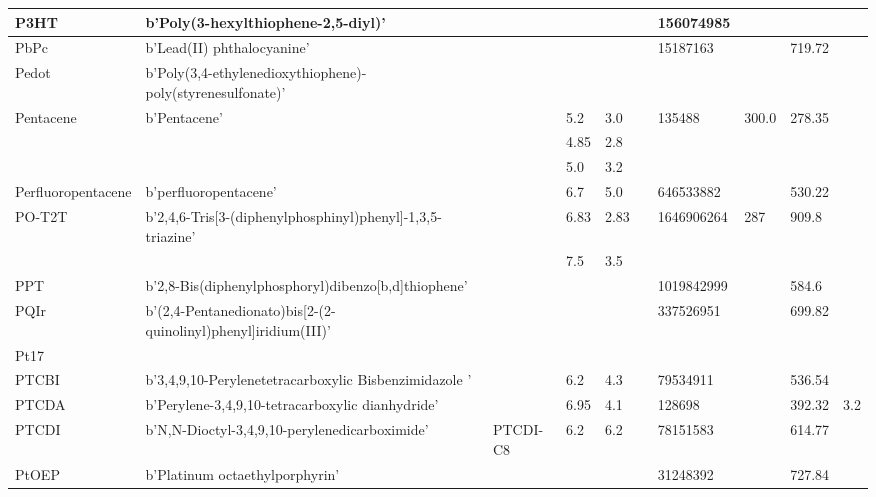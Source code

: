 \documentclass[../thesis.tex]{subfiles}
\begin{document}
\begin{landscape}
\begin{longtable}{| p{} | p{} | p{} | p{} | p{} | p{} | p{} | p{} | p{} | p{} | }
 \hline 
P3HT & b'Poly(3-hexylthiophene-2,5-diyl)' &  &  &  &  & 156074985 &  &  &  \\ 
 
 \hline 
PbPc & b'Lead(II) phthalocyanine' &  &  &  &  & 15187163 &  & 719.72 &  \\ 
 
 \hline 
Pedot & b'Poly(3,4-ethylenedioxythiophene)-poly(styrenesulfonate)' &  &  &  &  &  &  &  &  \\ 
 
 \hline 
Pentacene & b'Pentacene' &  & 5.2 & 3.0 &  & 135488 & 300.0 & 278.35 &  \\ 
 & &  & 4.85 & 2.8 &  &  & & & \\ 
 & &  & 5.0 & 3.2 &  &  & & & \\ 
 
 \hline 
Perfluoropentacene & b'perfluoropentacene' &  & 6.7 & 5.0 &  & 646533882 &  & 530.22 &  \\ 
 
 \hline 
PO-T2T & b'2,4,6-Tris[3-(diphenylphosphinyl)phenyl]-1,3,5-triazine' &  & 6.83 & 2.83 &  & 1646906264 & 287 & 909.8 &  \\ 
 & &  & 7.5 & 3.5 &  &  & & & \\ 
 
 \hline 
PPT & b'2,8-Bis(diphenylphosphoryl)dibenzo[b,d]thiophene' &  &  &  &  & 1019842999 &  & 584.6 &  \\ 
 
 \hline 
PQIr & b'(2,4-Pentanedionato)bis[2-(2-quinolinyl)phenyl]iridium(III)' &  &  &  &  & 337526951 &  & 699.82 &  \\ 
 
 \hline 
Pt17 &  &  &  &  &  &  &  &  &  \\ 
 
 \hline 
PTCBI & b'3,4,9,10-Perylenetetracarboxylic Bisbenzimidazole ' &  & 6.2 & 4.3 &  & 79534911 &  & 536.54 &  \\ 
 
 \hline 
PTCDA & b'Perylene-3,4,9,10-tetracarboxylic dianhydride' &  & 6.95 & 4.1 &  & 128698 &  & 392.32 & 3.2 \\ 
 
 \hline 
PTCDI & b'N,N-Dioctyl-3,4,9,10-perylenedicarboximide' & PTCDI-C8 & 6.2 & 6.2 &  & 78151583 &  & 614.77 &  \\ 
 
 \hline 
PtOEP & b'Platinum octaethylporphyrin' &  &  &  &  & 31248392 &  & 727.84 &  \\ 
 

\end{longtable}
\end{landscape}
\end{document}

